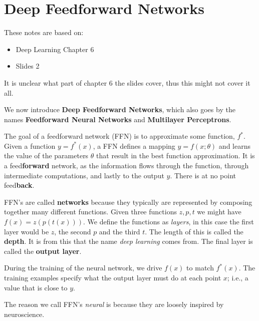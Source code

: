 \chapter{Deep Feedforward Networks}

\begin{note}
	These notes are based on:
	\begin{itemize}
		\item Deep Learning Chapter 6
		\item Slides 2
	\end{itemize}
	It is unclear what part of chapter 6 the slides cover, thus this might not cover it all.
\end{note}

We now introduce \textbf{Deep Feedforward Networks}, which also goes by the names \textbf{Feedforward Neural Networks} and \textbf{Multilayer Perceptrons}.

The goal of a feedforward network (FFN) is to approximate some function, $f^{*}$. Given a function $y = f^{*}(x)$, a FFN defines a mapping $y = f(x; \theta)$ and learns the value of the parameters \(\theta\) that result in the best function approximation. It is a feed\textbf{forward} network, as the information flows through the function, through intermediate computations, and lastly to the output $y$. There is at no point feed\textbf{back}.

FFN's are called \textbf{networks} because they typically are represented by composing together many different functions. Given three functions $z, p, t$ we might have $f(x) = z(p(t(x)))$. We define the functions as \textit{layers}, in this case the first layer would be $z$, the second $p$ and the third $t$. The length of this is called the \textbf{depth}. It is from this that the name \textit{deep learning} comes from. The final layer is called the \textbf{output layer}.

During the training of the neural network, we drive $f(x)$ to match $f^{*}(x)$. The training examples specify what the output layer must do at each point $x$; i.e., a value that is close to $y$.

The reason we call FFN's \textit{neural} is because they are loosely inspired by neuroscience.


